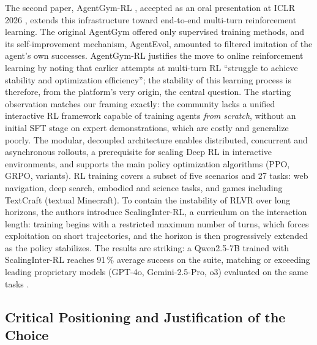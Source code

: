\documentclass[11pt,a4paper]{article}
\begin{document}
The second paper, AgentGym-RL \cite{xi_agentgym-rl_2025}, accepted as an oral presentation at ICLR 2026 \cite{xi_agentgymrl_openreview}, extends this infrastructure toward end-to-end multi-turn reinforcement learning. The original AgentGym offered only supervised training methods, and its self-improvement mechanism, AgentEvol, amounted to filtered imitation of the agent's own successes. AgentGym-RL justifies the move to online reinforcement learning by noting that earlier attempts at multi-turn RL ``struggle to achieve stability and optimization efficiency''; the stability of this learning process is therefore, from the platform's very origin, the central question.
The starting observation matches our framing exactly: the community lacks a unified interactive RL framework capable of training agents \emph{from scratch}, without an initial SFT stage on expert demonstrations, which are costly and generalize poorly. The modular, decoupled architecture enables distributed, concurrent and asynchronous rollouts, a prerequisite for scaling Deep RL in interactive environments, and supports the main policy optimization algorithms (PPO, GRPO, variants). RL training covers a subset of five scenarios and 27 tasks: web navigation, deep search, embodied and science tasks, and games including TextCraft (textual Minecraft). To contain the instability of RLVR over long horizons, the authors introduce ScalingInter-RL, a curriculum on the interaction length: training begins with a restricted maximum number of turns, which forces exploitation on short trajectories, and the horizon is then progressively extended as the policy stabilizes. The results are striking: a Qwen2.5-7B trained with ScalingInter-RL reaches 91\,\% average success on the suite, matching or exceeding leading proprietary models (GPT-4o, Gemini-2.5-Pro, o3) evaluated on the same tasks \cite{xi_agentgym-rl_2025}.

\subsection{Critical Positioning and Justification of the Choice}
\end{document}
